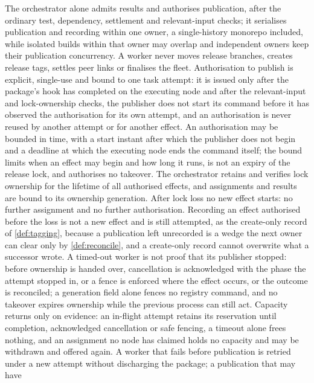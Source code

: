 \begin{definition}
\label{def:exec-publication}
The orchestrator alone admits results and authorises publication, after the
ordinary test, dependency, settlement and relevant-input checks; it serialises
publication and recording within one owner, a single-history monorepo
included, while isolated builds within that owner may overlap and independent
owners keep their publication concurrency. A worker never moves release
branches, creates release tags, settles peer links or finalises the fleet.
Authorisation to publish is explicit, single-use and bound to one task
attempt: it is issued only after the package's  hook has
completed on the executing node and after the relevant-input and lock-ownership
checks, the publisher does not start its command before it has observed the
authorisation for its own attempt, and an authorisation is never reused by
another attempt or for another effect. An authorisation may be bounded in
time, with a start instant after which the publisher does not begin and a
deadline at which the executing node ends the command itself; the bound
limits when an effect may begin and how long it runs, is not an expiry of the
release lock, and authorises no takeover. The orchestrator retains and
verifies lock ownership for the lifetime of all authorised effects, and
assignments and results are bound to its ownership generation. After lock
loss no new effect starts: no further assignment and no further
authorisation. Recording an effect authorised before the loss is not a new
effect and is still attempted, as the create-only record of
\cref{def:tagging}, because a publication left unrecorded is a wedge the next
owner can clear only by \cref{def:reconcile}, and a create-only record cannot
overwrite what a successor wrote. A timed-out worker is not proof that its
publisher stopped: before ownership is handed over, cancellation is
acknowledged with the phase the attempt stopped in, or a fence is enforced
where the effect occurs, or the outcome is reconciled; a generation field
alone fences no registry command, and no takeover expires ownership while the
previous process can still act. Capacity returns only on evidence: an
in-flight attempt retains its reservation until completion, acknowledged
cancellation or safe fencing, a timeout alone frees nothing, and an
assignment no node has claimed holds no capacity and may be withdrawn and
offered again. A worker that fails before publication is retried under a new
attempt without discharging the package; a publication that may have

\end{definition}

